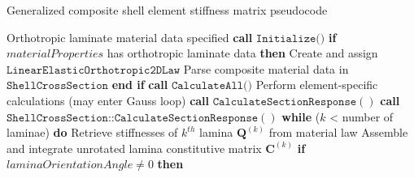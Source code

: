 \begin{algorithm}
	\onehalfspacing
	\caption{Generalized composite shell element stiffness matrix pseudocode}\label{general composite shell pseudocode}
	\begin{algorithmic}[1]
		\Require Orthotropic laminate material data specified
		\State \textbf{call} $\texttt{Initialize()}$
		\State \hspace{\algorithmicindent}\textbf{if} $materialProperties$ has orthotropic laminate data \textbf{then}
		\State \hspace{\algorithmicindent} \hspace{\algorithmicindent} Create and assign $\texttt{LinearElasticOrthotropic2DLaw}$
		\State \hspace{\algorithmicindent} \hspace{\algorithmicindent} Parse composite material data in $\texttt{ShellCrossSection}$
		\State \hspace{\algorithmicindent}\textbf{end if}
		\State \textbf{call} $\texttt{CalculateAll()}$
		\State \hspace{\algorithmicindent}Perform element-specific calculations (may enter Gauss loop)
		\State \hspace{\algorithmicindent}\textbf{call} $\texttt{CalculateSectionResponse}()$
		\State \hspace{\algorithmicindent}\hspace{\algorithmicindent} \textbf{call} $\texttt{ShellCrossSection::CalculateSectionResponse}()$
		\State \hspace{\algorithmicindent} \hspace{\algorithmicindent} \hspace{\algorithmicindent} \textbf{while} ($k$ < number of laminae) \textbf{do}
		\State \hspace{\algorithmicindent} \hspace{\algorithmicindent} \hspace{\algorithmicindent} \hspace{\algorithmicindent}Retrieve stiffnesses of $k^{th}$ lamina $\mathbf{Q}^{(k)}$ from material law
		\State \hspace{\algorithmicindent} \hspace{\algorithmicindent} \hspace{\algorithmicindent} \hspace{\algorithmicindent}Assemble and integrate unrotated lamina constitutive matrix $\mathbf{C}^{(k)}$
		\State \hspace{\algorithmicindent} \hspace{\algorithmicindent} \hspace{\algorithmicindent} \hspace{\algorithmicindent}\textbf{if} $laminaOrientationAngle \neq 0$ \textbf{then}

\end{algorithmic}
\end{algorithm}
